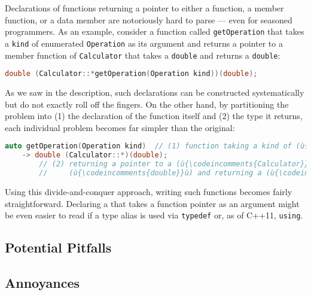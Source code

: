 Declarations of functions returning a pointer to either a function, a member function, or a data member are notoriously hard to parse --- even for seasoned programmers. As an example, consider a function called
\lstinline!getOperation! that takes a \lstinline!kind! of
enumerated \lstinline!Operation! as its argument and returns a pointer to a member
function of \lstinline!Calculator! that takes a \lstinline!double! and
returns a \lstinline!double!:

\begin{lstlisting}[language=C++]
double (Calculator::*getOperation(Operation kind))(double);
\end{lstlisting}
    
\noindent As we saw in the description, such declarations can be constructed
systematically but do not exactly roll off the fingers. On the other
hand, by partitioning the problem into (1) the declaration of the
function itself and (2) the type it returns, each individual problem
becomes far simpler than the original:

\begin{lstlisting}[language=C++]
auto getOperation(Operation kind)  // (1) function taking a kind of (ù{\codeincomments{Operation}}ù)
    -> double (Calculator::*)(double);  
        // (2) returning a pointer to a (ù{\codeincomments{Calculator}}ù) member function taking a 
        //     (ù{\codeincomments{double}}ù) and returning a (ù{\codeincomments{double}}ù)                                        
\end{lstlisting}
    
\noindent Using this divide-and-conquer approach, writing such functions becomes fairly straightforward. Declaring a  that
takes a function pointer as an argument might be even easier to read
if a type alias is used via \lstinline!typedef! or, as of C++11,
  \lstinline!using!.

\subsection[Potential Pitfalls]{Potential Pitfalls}\label{potential-pitfalls}

\hspace{\fill}

\subsection[Annoyances]{Annoyances}\label{annoyances}


